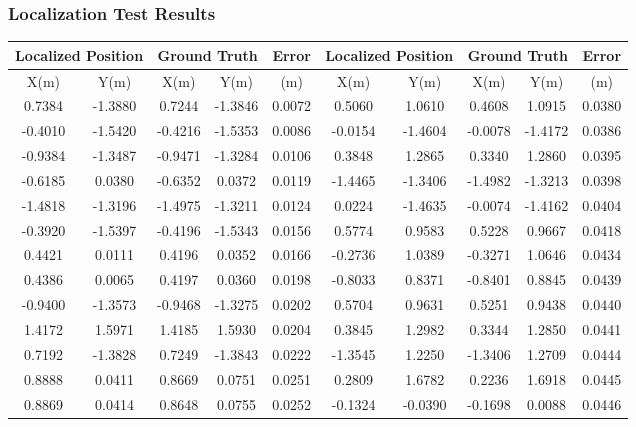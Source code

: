 \subsubsection{Localization Test Results}
\label{sec:locresults}
\begin{center}
\begin{table}[ht!]
\small
\resizebox{\textwidth}{!} {
\begin{tabular}{|c|c|c|c|c||c|c|c|c|c|}
\hline
\multicolumn{2}{|c|}{Localized Position} & \multicolumn{2}{c|}{Ground Truth} & Error & \multicolumn{2}{c|}{Localized Position} & \multicolumn{2}{c|}{Ground Truth} & Error\\ \hline
X(m) & Y(m) & X(m) & Y(m) & (m) & X(m) & Y(m) & X(m) & Y(m) & (m) \\ \hline \hline
0.7384 & -1.3880 & 0.7244 & -1.3846 & 0.0072 & 0.5060 & 1.0610 & 0.4608 & 1.0915 & 0.0380 \\ \hline
-0.4010 & -1.5420 & -0.4216 & -1.5353 & 0.0086 & -0.0154 & -1.4604 & -0.0078 & -1.4172 & 0.0386 \\ \hline
-0.9384 & -1.3487 & -0.9471 & -1.3284 & 0.0106 & 0.3848 & 1.2865 & 0.3340 & 1.2860 & 0.0395 \\ \hline
-0.6185 & 0.0380 & -0.6352 & 0.0372 & 0.0119 & -1.4465 & -1.3406 & -1.4982 & -1.3213 & 0.0398 \\ \hline
-1.4818 & -1.3196 & -1.4975 & -1.3211 & 0.0124 & 0.0224 & -1.4635 & -0.0074 & -1.4162 & 0.0404 \\ \hline
-0.3920 & -1.5397 & -0.4196 & -1.5343 & 0.0156 & 0.5774 & 0.9583 & 0.5228 & 0.9667 & 0.0418 \\ \hline
0.4421 & 0.0111 & 0.4196 & 0.0352 & 0.0166 & -0.2736 & 1.0389 & -0.3271 & 1.0646 & 0.0434 \\ \hline
0.4386 & 0.0065 & 0.4197 & 0.0360 & 0.0198 & -0.8033 & 0.8371 & -0.8401 & 0.8845 & 0.0439 \\ \hline
-0.9400 & -1.3573 & -0.9468 & -1.3275 & 0.0202 & 0.5704 & 0.9631 & 0.5251 & 0.9438 & 0.0440 \\ \hline
1.4172 & 1.5971 & 1.4185 & 1.5930 & 0.0204 & 0.3845 & 1.2982 & 0.3344 & 1.2850 & 0.0441 \\ \hline
0.7192 & -1.3828 & 0.7249 & -1.3843 & 0.0222 & -1.3545 & 1.2250 & -1.3406 & 1.2709 & 0.0444 \\ \hline
0.8888 & 0.0411 & 0.8669 & 0.0751 & 0.0251 & 0.2809 & 1.6782 & 0.2236 & 1.6918 & 0.0445 \\ \hline
0.8869 & 0.0414 & 0.8648 & 0.0755 & 0.0252 & -0.1324 & -0.0390 & -0.1698 & 0.0088 & 0.0446 \\ \hline

\end{tabular}}
\end{table}
\end{center}
